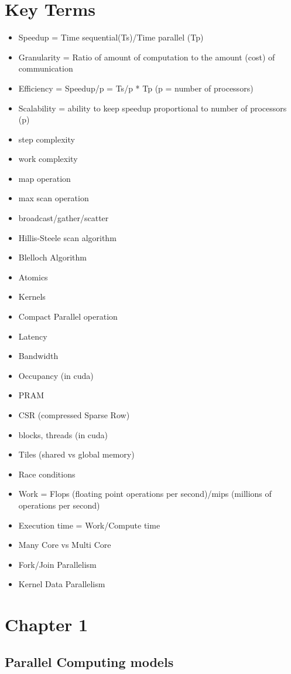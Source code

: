 \documentclass{assignments}
\author{David Lewis}
\date{\today}
\title{}
\begin{document}
\section*{Key Terms}
\label{sec:org9c0079b}
\begin{itemize}
\item Speedup = Time sequential(Ts)/Time parallel (Tp)
\item Granularity = Ratio of amount of computation to the amount (cost) of communication
\item Efficiency = Speedup/p = Ts/p * Tp (p = number of processors)
\item Scalability = ability to keep speedup proportional to number of processors (p)
\item step complexity
\item work complexity
\item map operation
\item max scan operation
\item broadcast/gather/scatter
\item Hillis-Steele scan algorithm
\item Blelloch Algorithm
\item Atomics
\item Kernels
\item Compact Parallel operation
\item Latency
\item Bandwidth
\item Occupancy (in cuda)
\item PRAM
\item CSR (compressed Sparse Row)
\item blocks, threads (in cuda)
\item Tiles (shared vs global memory)
\item Race conditions
\item Work = Flops (floating point operations per second)/mips (millions of
operations per second)
\item Execution time = Work/Compute time
\item Many Core vs Multi Core
\item Fork/Join Parallelism
\item Kernel Data Parallelism
\end{itemize}
\section*{Chapter 1}
\label{sec:orgb1584f0}
\subsection*{Parallel Computing models}
\label{sec:org78f256c}
\end{document}

